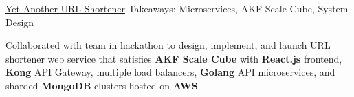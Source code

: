 \begin{cventries}
  \cventryprojects
    {\href{https://github.com/nguyensjsu/fa19-281-team-red-1}{Yet Another URL Shortener}} %
    {Takeaways: Microservices, AKF Scale Cube, System Design} %
    {
      \begin{cvitems} %
       \item {Collaborated with team in hackathon to design, implement, and launch URL shortener web service that satisfies \textbf{AKF Scale Cube} with \textbf{React.js} frontend, \textbf{Kong} API Gateway, multiple load balancers, \textbf{Golang} API microservices, and sharded \textbf{MongoDB} clusters hosted on \textbf{AWS}}
      \end{cvitems}
    }



\end{cventries}
